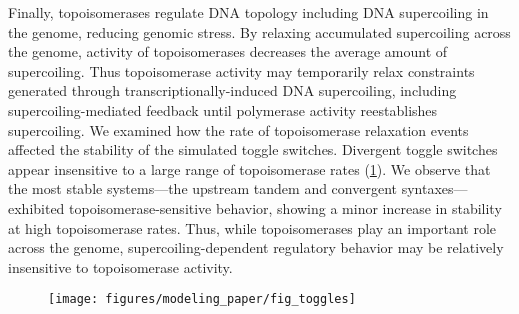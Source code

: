 \documentclass[11pt]{article}
\begin{document}
Finally, topoisomerases regulate DNA topology including DNA supercoiling in the genome, reducing genomic stress. %
By relaxing accumulated supercoiling across the genome, activity of topoisomerases decreases the average amount of supercoiling. Thus topoisomerase activity may temporarily relax constraints generated through transcriptionally-induced DNA supercoiling, including supercoiling-mediated feedback until polymerase activity reestablishes supercoiling.
We examined how the rate of topoisomerase relaxation events affected the stability of the simulated toggle switches. Divergent toggle switches appear insensitive to a large range of topoisomerase rates (\cref{fig:toggle_vs_topo_rate}). We observe that the most stable systems---the upstream tandem and convergent syntaxes---exhibited topoisomerase-sensitive behavior, showing a minor increase in stability at high topoisomerase rates. Thus, while topoisomerases play an important role across the genome, supercoiling-dependent regulatory behavior may be relatively insensitive to topoisomerase activity.
\begin{figure}[htbp]
    \centering
    {\texttt{[image: figures/modeling\_paper/fig\_toggles]}
    \label{fig:toggle_cartoon}
    \label{fig:toggle_basin_stability_over_time}
    \label{fig:toggle_stable_frac_n_2.0}
    \label{fig:toggle_burst_size}
    \label{fig:toggle_half_life_vs_mRNA_deg}
    \label{fig:toggle_vs_topo_rate}
    }
\end{figure}
\end{document}
